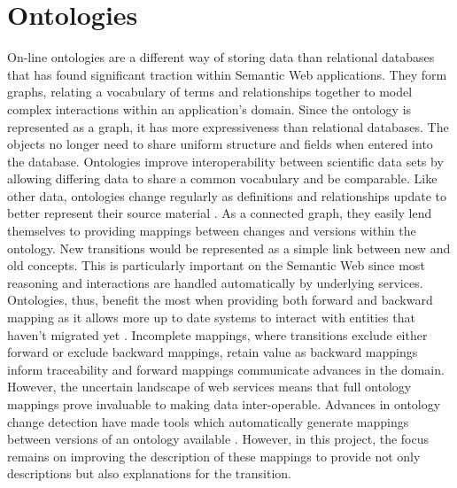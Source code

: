 \section{Ontologies}

On-line ontologies are a different way of storing data than relational databases that has found significant traction within Semantic Web applications.
They form graphs, relating a vocabulary of terms and relationships together to model complex interactions within an application's domain.
Since the ontology is represented as a graph, it has more expressiveness than relational databases.
The objects no longer need to share uniform structure and fields when entered into the database.
Ontologies improve interoperability between scientific data sets by allowing differing data to share a common vocabulary and be comparable.
Like other data, ontologies change regularly as definitions and relationships update to better represent their source material \cite{Ochs:2015:SVS:2826733.2826866}.
As a connected graph, they easily lend themselves to providing mappings between changes and versions within the ontology.
New transitions would be represented as a simple link between new and old concepts.
This is particularly important on the Semantic Web since most reasoning and interactions are handled automatically by underlying services.
Ontologies, thus, benefit the most when providing both forward and backward mapping as it allows more up to date systems to interact with entities that haven't migrated yet \cite{Klein01ontologyversioning}.
Incomplete mappings, where transitions exclude either forward or exclude backward mappings, retain value as backward mappings inform traceability and forward mappings communicate advances in the domain.
However, the uncertain landscape of web services means that full ontology mappings prove invaluable to making data inter-operable.
Advances in ontology change detection have made tools which automatically generate mappings between versions of an ontology available \cite{Hartung201315}.
However, in this project, the focus remains on improving the description of these mappings to provide not only descriptions but also explanations for the transition.

